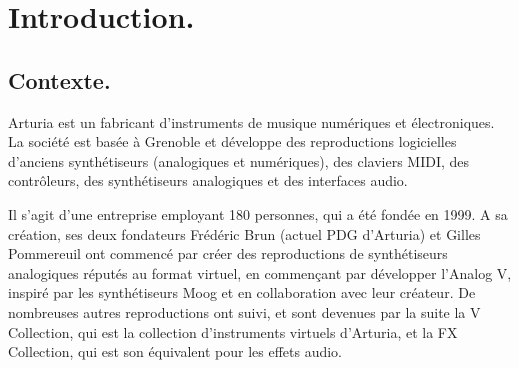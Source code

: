 \documentclass[francais]{rapportPFE}  %
\begin{document}
\begin{ResumeMotsCles}
\end{ResumeMotsCles}








\setcounter{tocdepth}{3}
\tableofcontents
\cleardoublepage




     
     
     
\section{Introduction.}
\subsection{Contexte.}

Arturia est un fabricant d'instruments de musique numériques et électroniques. La société est basée à Grenoble et développe des reproductions logicielles d'anciens synthétiseurs (analogiques et numériques), des claviers MIDI, des contrôleurs, des synthétiseurs analogiques et des interfaces audio. 

Il s'agit d'une entreprise employant 180 personnes, qui a été fondée en 1999. A sa création, ses deux fondateurs Frédéric Brun (actuel PDG d'Arturia) et Gilles Pommereuil ont commencé par créer des reproductions de synthétiseurs analogiques réputés au format virtuel, en commençant par développer l'Analog V, inspiré par les synthétiseurs Moog et en collaboration avec leur créateur. De nombreuses autres reproductions ont suivi, et sont devenues par la suite la V Collection, qui est la collection d'instruments virtuels d'Arturia, et la FX Collection, qui est son équivalent pour les effets audio.
\end{document}
